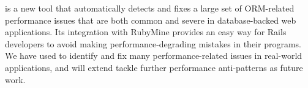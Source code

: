 \Tool is a new tool that automatically detects and fixes a large set of 
ORM-related performance issues that are both common and severe in database-backed
web applications. Its integration with RubyMine provides an easy way for
Rails developers to avoid making performance-degrading mistakes in their
programs. We have used \Tool to identify and fix many performance-related issues in real-world applications, and will extend \Tool tackle further performance anti-patterns as future work.

